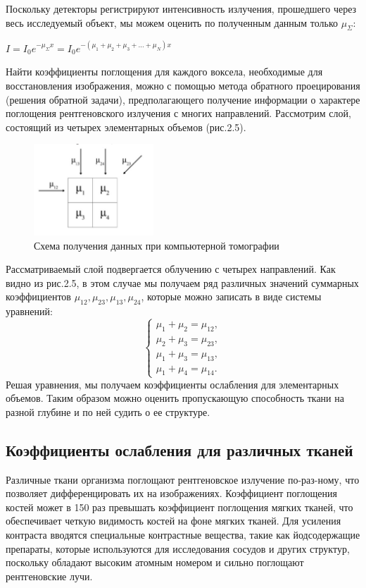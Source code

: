 Поскольку детекторы регистрируют интенсивность излучения, прошедшего через весь исследуемый объект, мы можем оценить по полученным данным только $\mu_{\Sigma}$:
\begin{center}
    $I = I_0 e^{-\mu_{\Sigma} x} = I_0 e^{-(\mu_1 + \mu_2 + \mu_3 + \dots + \mu_N)x}$
\end{center}
Найти коэффициенты поглощения для каждого воксела, необходимые для восстановления изображения, можно с помощью метода обратного проецирования (решения обратной задачи), предполагающего получение информации о характере поглощения рентгеновского излучения с многих направлений. Рассмотрим слой, состоящий из четырех элементарных объемов (рис.2.5).
\begin{figure}[H]
    \centering
    \includegraphics[width=0.4\textwidth]{pic/6.png}
    \caption{Схема получения данных при компьютерной томографии}
    \label{fig:image1}
\end{figure}
Рассматриваемый слой подвергается облучению с четырех направлений. Как видно из рис.2.5, в этом случае мы получаем ряд различных значений суммарных коэффициентов $\mu_{12}, \mu_{23}, \mu_{13}, \mu_{24}$, которые можно записать в виде системы уравнений:
\[
\begin{cases}
\mu_1 + \mu_2 = \mu_{12}, \\
\mu_2 + \mu_3 = \mu_{23}, \\
\mu_1 + \mu_3 = \mu_{13}, \\
\mu_1 + \mu_4 = \mu_{14}.
\end{cases}
\]  
Решая уравнения, мы получаем коэффициенты ослабления для элементарных объемов. Таким образом можно оценить пропускающую способность ткани на разной глубине и по ней судить о ее структуре\cite{ktmrt}.

\subsection{Коэффициенты ослабления для различных тканей}

Различные ткани организма поглощают рентгеновское излучение по-раз-ному, что позволяет дифференцировать их на изображениях. Коэффициент поглощения костей может в 150 раз превышать коэффициент поглощения мягких тканей, что обеспечивает четкую видимость костей на фоне мягких тканей. Для усиления контраста вводятся специальные контрастные вещества, такие как йодсодержащие препараты, которые используются для исследования сосудов и других структур, поскольку обладают высоким атомным номером и сильно поглощают рентгеновские лучи.

